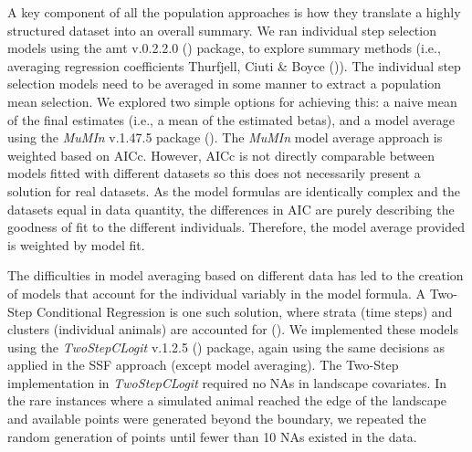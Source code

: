 \documentclass[10pt,a4paper]{article}
\begin{document}
A key component of all the population approaches is how they translate a highly structured dataset into an overall summary.
We ran individual step selection models using the amt v.0.2.2.0 () package, to explore summary methods (i.e., averaging regression coefficients Thurfjell, Ciuti \& Boyce ()).
The individual step selection models need to be averaged in some manner to extract a population mean selection.
We explored two simple options for achieving this: a naive mean of the final estimates (i.e., a mean of the estimated betas), and a model average using the \emph{MuMIn} v.1.47.5 package ().
The \emph{MuMIn} model average approach is weighted based on AICc.
However, AICc is not directly comparable between models fitted with different datasets so this does not necessarily present a solution for real datasets.
As the model formulas are identically complex and the datasets equal in data quantity, the differences in AIC are purely describing the goodness of fit to the different individuals.
Therefore, the model average provided is weighted by model fit.

The difficulties in model averaging based on different data has led to the creation of models that account for the individual variably in the model formula.
A Two-Step Conditional Regression is one such solution, where strata (time steps) and clusters (individual animals) are accounted for ().
We implemented these models using the \emph{TwoStepCLogit} v.1.2.5 () package, again using the same decisions as applied in the SSF approach (except model averaging).
The Two-Step implementation in \emph{TwoStepCLogit} required no NAs in landscape covariates.
In the rare instances where a simulated animal reached the edge of the landscape and available points were generated beyond the boundary, we repeated the random generation of points until fewer than 10 NAs existed in the data.
\end{document}
